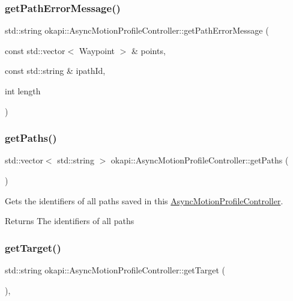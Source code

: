 \subsubsection{\texorpdfstring{getPathErrorMessage()}{getPathErrorMessage()}}
{\footnotesize\ttfamily std\+::string okapi\+::\+Async\+Motion\+Profile\+Controller\+::get\+Path\+Error\+Message (\begin{DoxyParamCaption}\item[{const std\+::vector$<$ Waypoint $>$ \&}]{points,  }\item[{const std\+::string \&}]{ipath\+Id,  }\item[{int}]{length }\end{DoxyParamCaption})\hspace{0.3cm}{\ttfamily [protected]}}

\mbox{\label{classokapi_1_1AsyncMotionProfileController_a5853ae5af552cf56f36c9563733c6ace}} 
\subsubsection{\texorpdfstring{getPaths()}{getPaths()}}
{\footnotesize\ttfamily std\+::vector$<$ std\+::string $>$ okapi\+::\+Async\+Motion\+Profile\+Controller\+::get\+Paths (\begin{DoxyParamCaption}{ }\end{DoxyParamCaption})}

Gets the identifiers of all paths saved in this {\ttfamily \mbox{\hyperlink{classokapi_1_1AsyncMotionProfileController}{Async\+Motion\+Profile\+Controller}}}.

\begin{DoxyReturn}{Returns}
The identifiers of all paths 
\end{DoxyReturn}
\mbox{\label{classokapi_1_1AsyncMotionProfileController_a9f9e44e987481619cbec37d5e35c71e8}} 
\subsubsection{\texorpdfstring{getTarget()}{getTarget()}}
{\footnotesize\ttfamily std\+::string okapi\+::\+Async\+Motion\+Profile\+Controller\+::get\+Target (\begin{DoxyParamCaption}{ }\end{DoxyParamCaption})\hspace{0.3cm}{\ttfamily [override]}, {\ttfamily [virtual]}}

